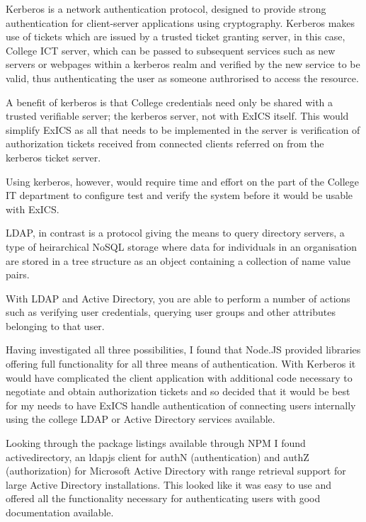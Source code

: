 Kerberos is a network authentication protocol, designed to provide strong authentication for client-server applications using cryptography.\cite{whatiskerberos}  Kerberos makes use of tickets which are issued by a trusted ticket granting server, in this case, College ICT server, which can be passed to subsequent services such as new servers or webpages within a kerberos realm and verified by the new service to be valid, thus authenticating the user as someone authrorised to access the resource.\cite{explainlikeIm5}

A benefit of kerberos is that College credentials need only be shared with a trusted verifiable server; the kerberos server, not with ExICS itself.  This would simplify ExICS as all that needs to be implemented in the server is verification of authorization tickets received from connected clients referred on from the kerberos ticket server.

Using kerberos, however, would require time and effort on the part of the College IT department to configure test and verify the system before it would be usable with ExICS.

LDAP, in contrast is a protocol giving the means to query directory servers, a type of heirarchical NoSQL storage where data for individuals in an organisation are stored in a tree structure as an object containing a collection of name value pairs.

With LDAP and Active Directory, you are able to perform a number of actions such as verifying user credentials, querying user groups and other attributes belonging to that user.

Having investigated all three possibilities, I found that Node.JS provided libraries offering full functionality for all three means of authentication.  With Kerberos it would have complicated the client application with additional code necessary to negotiate and obtain authorization tickets and so decided that it would be best for my needs to have ExICS handle authentication of connecting users internally using the college LDAP or Active Directory services available.

Looking through the package listings available through NPM I found activedirectory, an ldapjs client for authN (authentication) and authZ (authorization) for Microsoft Active Directory with range retrieval support for large Active Directory installations.\cite{activedirectory}  This looked like it was easy to use and offered all the functionality necessary for authenticating users with good documentation available.


